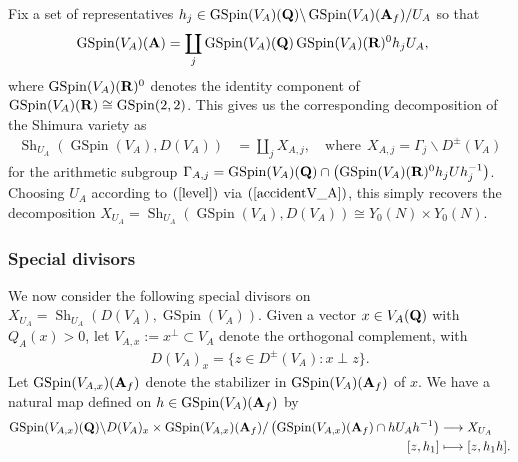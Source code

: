 \documentclass{amsart}
\theoremstyle{definition}
\begin{document}
Fix a set of representatives $h_j \in \operatorname{GSpin}(V_A)({\bf{Q}}) \backslash \operatorname{GSpin}(V_A)({\bf{A}}_f) /U_A$ so that
\begin{align}\label{GS-decomp} \operatorname{GSpin}(V_A)({\bf{A}}) 
&= \coprod_j \operatorname{GSpin}(V_A)({\bf{Q}}) \operatorname{GSpin}(V_A)({\bf{R}})^0 h_j U_A, \end{align}
where $\operatorname{GSpin}(V_A)({\bf{R}})^0$ denotes the identity component of 
$\operatorname{GSpin}(V_A)({\bf{R}}) \cong \operatorname{GSpin}(2,2)$. 
This gives us the corresponding decomposition of the Shimura variety as 
\begin{equation}\begin{aligned}\label{Sh-decomp} 
\operatorname{Sh}_{U_A}(\operatorname{GSpin}(V_A), D(V_A)) 
&= \coprod_j X_{A, j}, \quad \text{where} ~~ X_{A,j} = \Gamma_j \backslash D^{\pm}(V_A) \end{aligned}\end{equation}
for the arithmetic subgroup  
$ \Gamma_{A, j} = \operatorname{GSpin}(V_A)({\bf{Q}}) \cap \left( \operatorname{GSpin}(V_A)({\bf{R}})^0 h_j U h_j^{-1} \right)$.
Choosing $U_A$ according to $(\ref{level})$ via $(\ref{accidentV_A})$, this simply recovers the 
decomposition $X_{U_A}=\operatorname{Sh}_{U_A}(\operatorname{GSpin}(V_A), D(V_A)) \cong Y_0(N) \times Y_0(N)$.

\subsubsection{Special divisors} 

We now consider the following special divisors on $X_{U_A} = \operatorname{Sh}_{U_A}(D(V_A), \operatorname{GSpin}(V_A))$.
Given a vector $x \in V_A({\bf{Q}})$ with $Q_A(x) > 0$, let $V_{A, x}:= x^{\perp} \subset V_A$ denote the orthogonal complement, with 
\begin{align*} D(V_A)_x  = \lbrace z \in D^{\pm}(V_A): x \perp z \rbrace. \end{align*}
Let $\operatorname{GSpin}(V_{A, x})({\bf{A}}_f)$ denote the stabilizer in $\operatorname{GSpin}(V_A)({\bf{A}}_f)$ of $x$.
We have a natural map defined on $h \in \operatorname{GSpin}(V_A)({\bf{A}}_f)$ by 
\begin{equation}\begin{aligned}\label{natural-x}
\operatorname{GSpin}(V_{A, x})({\bf{Q}}) \backslash D(V_A)_x \times \operatorname{GSpin}(V_{A, x})({\bf{A}}_f) / 
\left( \operatorname{GSpin}(V_{A, x})({\bf{A}}_f) \cap h U_A h^{-1}  \right)
&\longrightarrow X_{U_A} \\ [z, h_1] &\longmapsto [z, h_1 h]. \end{aligned}\end{equation}
\end{document}
